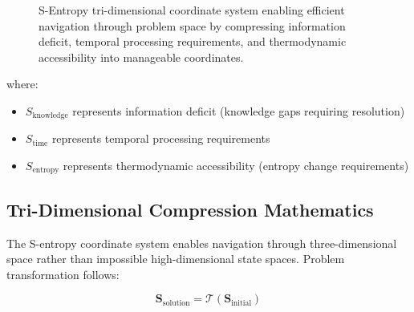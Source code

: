 \documentclass[12pt,a4paper]{article}
\begin{document}
\begin{figure}[h]
\centering
{}
\caption{S-Entropy tri-dimensional coordinate system enabling efficient navigation through problem space by compressing information deficit, temporal processing requirements, and thermodynamic accessibility into manageable coordinates.}
\label{fig:s_entropy_coordinates}
\end{figure}

where:
\begin{itemize}
\item $S_{\text{knowledge}}$ represents information deficit (knowledge gaps requiring resolution)
\item $S_{\text{time}}$ represents temporal processing requirements
\item $S_{\text{entropy}}$ represents thermodynamic accessibility (entropy change requirements)
\end{itemize}

\subsection{Tri-Dimensional Compression Mathematics}

The S-entropy coordinate system enables navigation through three-dimensional space rather than impossible high-dimensional state spaces. Problem transformation follows:

$$\mathbf{S}_{\text{solution}} = \mathcal{T}(\mathbf{S}_{\text{initial}})$$
\end{document}
